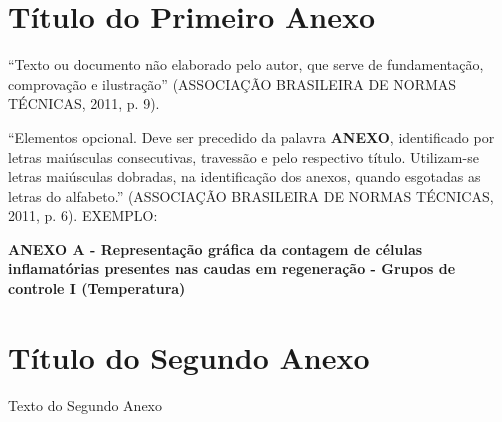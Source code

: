 \documentclass[
        12pt,
        openany, %
        oneside, %
        a4paper,			
        english,			
        brazil			        %
        ]{abntbibufjf}
\begin{document}

\begin{anexosenv}

\chapter{T\'itulo do Primeiro Anexo}
``Texto ou documento n\~ao elaborado pelo autor, que serve de fundamenta\c{c}\~ao, 
comprova\c{c}\~ao e ilustra\c{c}\~ao''
(ASSOCIA\c{C}\~AO BRASILEIRA DE NORMAS T\'ECNICAS, 2011, p. 9).

``Elementos opcional. Deve ser precedido da palavra \textbf{ANEXO}, identificado por letras mai\'usculas 
consecutivas, travess\~ao e pelo respectivo t\'itulo. Utilizam-se letras mai\'usculas dobradas, 
na identifica\c{c}\~ao dos anexos, quando esgotadas as letras do alfabeto.''
(ASSOCIA\c{C}\~AO BRASILEIRA DE NORMAS T\'ECNICAS, 2011, p. 6).
\newline
EXEMPLO: 
\begin{center}
\textbf{ANEXO A - Representa\c{c}\~ao gr\'afica da contagem de c\'elulas inflamat\'orias presentes
nas caudas em regenera\c{c}\~ao - Grupos de controle I (Temperatura)}
\end{center}


\chapter{T\'itulo do Segundo Anexo}
Texto do Segundo Anexo


\end{anexosenv}

\end{document}
